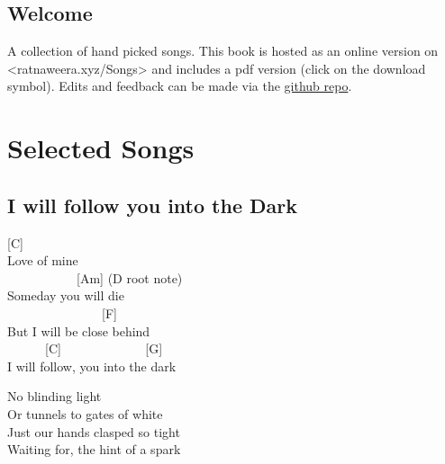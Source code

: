 \documentclass[
  letterpaper,
  twoside=false]{scrbook}
\renewcommand*\contentsname{Table of contents}
\newcommand\contentsname{Table of contents}
\begin{document}
\ifdefined\Shaded\renewenvironment{Shaded}{\begin{tcolorbox}[interior hidden, borderline west={3pt}{0pt}{shadecolor}, enhanced, frame hidden, boxrule=0pt, breakable, sharp corners]}{\end{tcolorbox}}\fi

\renewcommand*\contentsname{Table of contents}
{
\setcounter{tocdepth}{2}
\tableofcontents
}
\mainmatter
{}

\hypertarget{title}{%
\chapter*{Welcome}\label{title}}


A collection of hand picked songs. This book is hosted as an online
version on \textless ratnaweera.xyz/Songs\textgreater{} and includes a
pdf version (click on the download symbol). Edits and feedback can be
made via the \href{https://github.com/ratnanil/songs}{github repo}.

\part{Selected Songs}

\hypertarget{i-will-follow-you-into-the-dark}{%
\chapter{I will follow you into the
Dark}\label{i-will-follow-you-into-the-dark}}

{[}C{]}\\
Love of mine\\
\hspace*{0.333em} ~ ~ ~ ~ ~ ~ ~{[}Am{]} (D root note)\\
Someday you will die\\
\hspace*{0.333em} ~ ~ ~ ~ ~ ~ ~ ~ ~ {[}F{]}\\
But I will be close behind\\
\hspace*{0.333em} ~ ~ ~ ~{[}C{]} ~ ~ ~ ~ ~ ~ ~ ~{[}G{]}\\
I will follow, you into the dark

No blinding light\\
Or tunnels to gates of white\\
Just our hands clasped so tight\\
Waiting for, the hint of a spark
\end{document}

